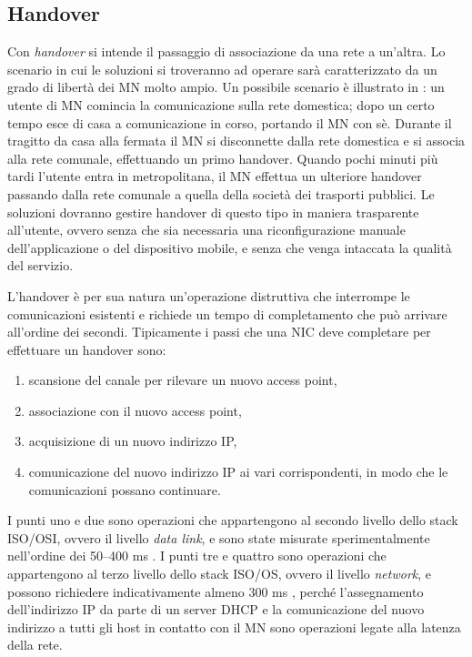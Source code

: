 \documentclass[12pt,a4paper,openright,twoside]{book}
\begin{document}
\subsection{Handover}
\label{sec:handover}
Con \emph{handover} si intende il passaggio di associazione da una
rete a un'altra. Lo scenario in cui le soluzioni si troveranno ad
operare sarà caratterizzato da un grado di libertà dei MN molto
ampio. Un possibile scenario è illustrato in \cite{bib:abc}: un utente
di MN comincia la comunicazione sulla rete domestica; dopo un certo
tempo esce di casa a comunicazione in corso, portando il MN con
sè. Durante il tragitto da casa alla fermata il MN si disconnette
dalla rete domestica e si associa alla rete comunale, effettuando un
primo handover. Quando pochi minuti più tardi l'utente entra in
metropolitana, il MN effettua un ulteriore handover passando dalla
rete comunale a quella della società dei trasporti pubblici. Le
soluzioni dovranno gestire handover di questo tipo in maniera
trasparente all'utente, ovvero senza che sia necessaria una
riconfigurazione manuale dell'applicazione o del dispositivo mobile, e
senza che venga intaccata la qualità del servizio.

L'handover è per sua natura un'operazione distruttiva che interrompe
le comunicazioni esistenti e richiede un tempo di completamento che
può arrivare all'ordine dei secondi. Tipicamente i passi che una NIC
deve completare per effettuare un handover sono:
\begin{enumerate}
\item scansione del canale per rilevare un nuovo access point,
\item associazione con il nuovo access point,
\item acquisizione di un nuovo indirizzo IP,
\item comunicazione del nuovo indirizzo IP ai vari corrispondenti, in
  modo che le comunicazioni possano continuare.
\end{enumerate}
I punti uno e due sono operazioni che appartengono al secondo livello
dello stack ISO/OSI, ovvero il livello \emph{data link}, e sono state
misurate sperimentalmente nell'ordine dei 50--400 ms
\cite{bib:misura-handoff-l2}. I punti tre e quattro sono operazioni
che appartengono al terzo livello dello stack ISO/OS, ovvero il
livello \emph{network}, e possono richiedere indicativamente almeno
300 ms \cite{bib:misura-handoff-dhcp}, perché l'assegnamento
dell'indirizzo IP da parte di un server DHCP e la comunicazione del
nuovo indirizzo a tutti gli host in contatto con il MN sono operazioni
legate alla latenza della rete.
\end{document}
